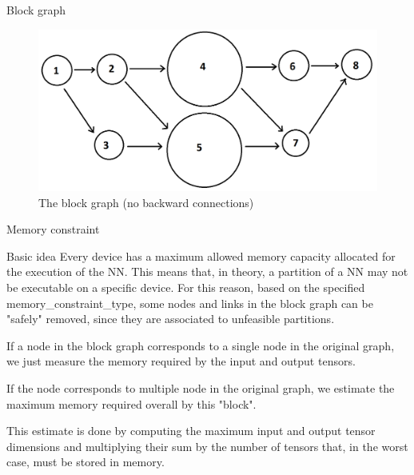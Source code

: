 \begin{frame}[allowframebreaks]{Block graph}
\begin{multicols}{2}
        \begin{figure}[h]
        \centering
    \includegraphics[width=0.75\linewidth]{Img/butcher/block_graph_no_backward_connections.png}
    \caption{The block graph (no backward connections)}
    \end{figure}
    \end{multicols}
    
    
    
\end{frame}

\begin{frame}{Memory constraint}
    \begin{block}{Basic idea}
    Every device has a maximum allowed memory capacity allocated for the execution of the NN. This means that, in theory, a partition of a NN may not be executable on a specific device. For this reason, based on the specified memory\_constraint\_type, some nodes and links in the block graph can be "safely" removed, since they are associated to unfeasible partitions.
    \end{block}
    
    If a node in the block graph corresponds to a single node in the original graph, we just measure the memory required by the input and output tensors. 
    
    If the node corresponds to multiple node in the original graph, we estimate the maximum memory required overall by this "block". 
    
    This estimate is done by computing the maximum input and output tensor dimensions and multiplying their sum by the number of tensors that, in the worst case, must be stored in memory.
\end{frame}

